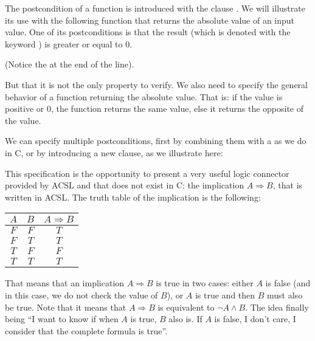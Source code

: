 The postcondition of a function is introduced with the clause . 
We will illustrate its use with the following function
that returns the absolute value of an input value. One of its postconditions
is that the result (which is denoted with the keyword
) is greater or equal to 0.






(Notice the \CodeInline{;} at the end of the line).

But that it is not the only property to verify. We also need to specify
the general behavior of a function returning the absolute value. That
is: if the value is positive or 0, the function returns the same value,
else it returns the opposite of the value.

We can specify multiple postconditions, first by combining them with a
\CodeInline{\&\&} as we do in C, or by introducing a new 
clause, as we illustrate here:







This specification is the opportunity to present a very useful logic
connector provided by ACSL and that does not exist in C: the implication
$A \Rightarrow B$, that is written  in
ACSL. The truth table of the implication is the following:



\begin{longtabu}{|c|c|c|} \hline
$A$ & $B$ & $A \Rightarrow B$ \\ \hline
$F$ & $F$ & $T$ \\ \hline
$F$ & $T$ & $T$ \\ \hline
$T$ & $F$ & $F$ \\ \hline
$T$ & $T$ & $T$ \\ \hline
\end{longtabu}



That means that an implication $A \Rightarrow B$ is true in two cases:
either $A$ is false (and in this case, we do not check the value of
$B$), or $A$ is true and then $B$ must also be true. Note that it means
that $A \Rightarrow B$ is equivalent to $\neg A \wedge B$. The idea
finally being ``I want to know if when $A$ is true, $B$ also is. If
$A$ is false, I don't care, I consider that the complete formula is
true''.



